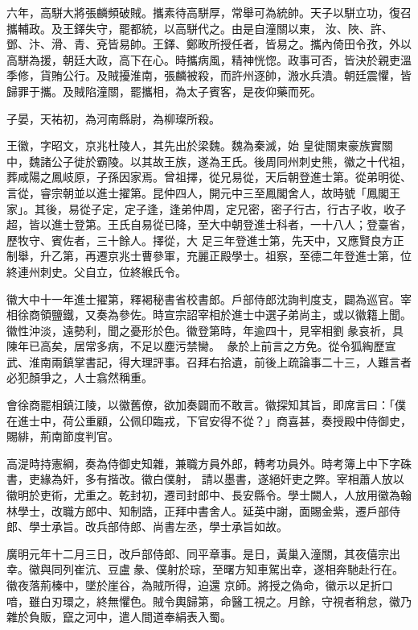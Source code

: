 \begin{pinyinscope}
 六年，高駢大將張麟頻破賊。攜素待高駢厚，常舉可為統帥。天子以駢立功，復召攜輔政。及王鐸失守，罷都統，以高駢代之。由是自潼關以東，
 汝、陜、許、鄧、汴、滑、青、兗皆易帥。王鐸、鄭畋所授任者，皆易之。攜內倚田令孜，外以高駢為援，朝廷大政，高下在心。時攜病風，精神恍惚。政事可否，皆決於親吏溫季修，貨賄公行。及賊擾淮南，張麟被殺，而許州逐帥，溵水兵潰。朝廷震懼，皆歸罪于攜。及賊陷潼關，罷攜相，為太子賓客，是夜仰藥而死。



 子晏，天祐初，為河南縣尉，為柳璨所殺。



 王徽，字昭文，京兆杜陵人，其先出於梁魏。魏為秦滅，始
 皇徙關東豪族實關中，魏諸公子徙於霸陵。以其故王族，遂為王氏。後周同州刺史熊，徽之十代祖，葬咸陽之鳳岐原，子孫因家焉。曾祖擇，從兄易從，天后朝登進士第。從弟明從、言從，睿宗朝並以進士擢第。昆仲四人，開元中三至鳳閣舍人，故時號「鳳閣王家」。其後，易從子定，定子逢，逢弟仲周，定兄密，密子行古，行古子收，收子超，皆以進士登第。王氏自易從已降，至大中朝登進士科者，一十八人；登臺省，歷牧守、賓佐者，三十餘人。擇從，大
 足三年登進士第，先天中，又應賢良方正制舉，升乙第，再遷京兆士曹參軍，充麗正殿學士。祖察，至德二年登進士第，位終連州刺史。父自立，位終緱氏令。



 徽大中十一年進士擢第，釋褐秘書省校書郎。戶部侍郎沈詢判度支，闢為巡官。宰相徐商領鹽鐵，又奏為參佐。時宣宗詔宰相於進士中選子弟尚主，或以徽籍上聞。徽性沖淡，遠勢利，聞之憂形於色。徽登第時，年逾四十，見宰相劉彖哀祈，具陳年已高矣，居常多病，不足以塵污禁臠。
 彖於上前言之方免。從令狐綯歷宣武、淮南兩鎮掌書記，得大理評事。召拜右拾遺，前後上疏論事二十三，人難言者必犯顏爭之，人士翕然稱重。



 會徐商罷相鎮江陵，以徽舊僚，欲加奏闢而不敢言。徽探知其旨，即席言曰：「僕在進士中，荷公重顧，公佩印臨戎，下官安得不從？」商喜甚，奏授殿中侍御史，賜緋，荊南節度判官。



 高湜時持憲綱，奏為侍御史知雜，兼職方員外郎，轉考功員外。時考簿上中下字硃書，吏緣為奸，多有揩改。徽白僕射，
 請以墨書，遂絕奸吏之弊。宰相蕭人放以徽明於吏術，尤重之。乾封初，遷司封郎中、長安縣令。學士闕人，人放用徽為翰林學士，改職方郎中、知制誥，正拜中書舍人。延英中謝，面賜金紫，遷戶部侍郎、學士承旨。改兵部侍郎、尚書左丞，學士承旨如故。



 廣明元年十二月三日，改戶部侍郎、同平章事。是日，黃巢入潼關，其夜僖宗出幸。徽與同列崔沆、豆盧彖、僕射於琮，至曙方知車駕出幸，遂相奔馳赴行在。徽夜落荊榛中，墜於崖谷，為賊所得，迫還
 京師。將授之偽命，徽示以足折口喑，雖白刃環之，終無懼色。賊令輿歸第，命醫工視之。月餘，守視者稍怠，徽乃雜於負販，竄之河中，遣人間道奉絹表入蜀。




\end{pinyinscope}
